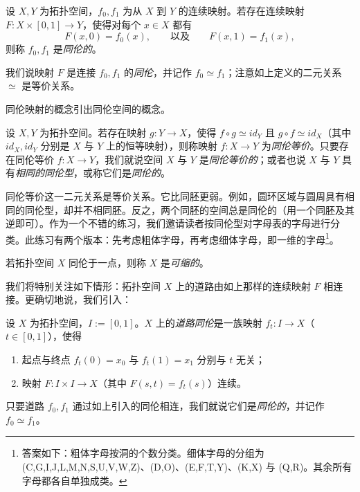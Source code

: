 \begin{definition}[1.5]
设 $X,Y$ 为拓扑空间，$f_0,f_1$ 为从 $X$ 到 $Y$ 的连续映射。若存在连续映射 $F\colon X\times[0,1]\to Y$，使得对每个 $x\in X$ 都有
\[
F(x,0)=f_0(x),\qquad\text{以及}\qquad F(x,1)=f_1(x),
\]
则称 $f_0,f_1$ 是\emph{同伦的}。
\end{definition}

我们说映射 $F$ 是连接 $f_0,f_1$ 的\emph{同伦}，并记作 $f_0\simeq f_1$；注意如上定义的二元关系 $\simeq$ 是等价关系。

同伦映射的概念引出同伦空间的概念。

\begin{definition}[1.6]
设 $X,Y$ 为拓扑空间。若存在映射 $g\colon Y\to X$，使得 $f\circ g\simeq id_Y$ 且 $g\circ f\simeq id_X$（其中 $id_X,id_Y$ 分别是 $X$ 与 $Y$ 上的恒等映射），则称映射 $f\colon X\to Y$ 为\emph{同伦等价}。只要存在同伦等价 $f\colon X\to Y$，我们就说空间 $X$ 与 $Y$ 是\emph{同伦等价的}；或者也说 $X$ 与 $Y$ 具有\emph{相同的同伦型}，或称它们是\emph{同伦的}。
\end{definition}

同伦等价这一二元关系是等价关系。它比同胚更弱。例如，圆环区域与圆周具有相同的同伦型，却并不相同胚。反之，两个同胚的空间总是同伦的（用一个同胚及其逆即可）。作为一个不错的练习，我们邀请读者按同伦型对字母表的字母进行分类。此练习有两个版本：先考虑粗体字母，再考虑细体字母，即一维的字母\footnote{答案如下：粗体字母按洞的个数分类。细体字母的分组为 (C,G,I,J,L,M,N,S,U,V,W,Z)、(D,O)、(E,F,T,Y)、(K,X) 与 (Q,R)。其余所有字母都各自单独成类。}。

\begin{definition}[1.7]
若拓扑空间 $X$ 同伦于一点，则称 $X$ 是\emph{可缩的}。
\end{definition}

我们将特别关注如下情形：拓扑空间 $X$ 上的道路由如上那样的连续映射 $F$ 相连接。更确切地说，我们引入：

\begin{definition}[1.8]
设 $X$ 为拓扑空间，$I:=[0,1]$。$X$ 上的\emph{道路同伦}是一族映射 $f_t\colon I\to X$（$t\in[0,1]$），使得
\begin{enumerate}
\item 起点与终点 $f_t(0)=x_0$ 与 $f_t(1)=x_1$ 分别与 $t$ 无关；
\item 映射 $F\colon I\times I\to X$（其中 $F(s,t)=f_t(s)$）连续。
\end{enumerate}
只要道路 $f_0,f_1$ 通过如上引入的同伦相连，我们就说它们是\emph{同伦的}，并记作 $f_0\simeq f_1$。
\end{definition}

